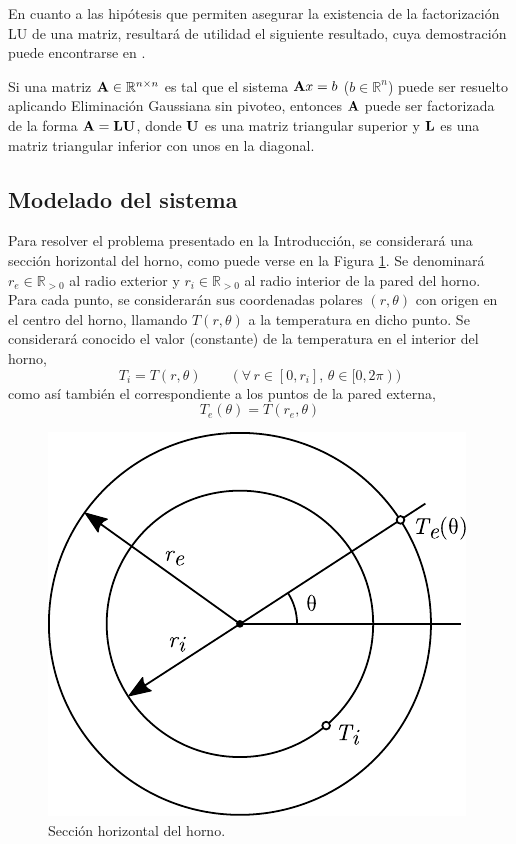             En cuanto a las hipótesis que permiten asegurar la existencia de la factorización LU de una matriz, resultará de utilidad el siguiente resultado, cuya demostración puede encontrarse en \cite[p.~403]{burden}.

            \begin{prop} \label{prop:EG sin pivoteo implica LU}
                Si una matriz $\mathbf{A} \in \mathbb{R}^{n \times n}$ es tal que el sistema $\mathbf{A}x=b$ ($b \in \mathbb{R}^{n}$) puede ser resuelto aplicando Eliminación Gaussiana sin pivoteo, entonces $\mathbf{A}$ puede ser factorizada de la forma $\mathbf{A}=\mathbf{L}\mathbf{U}$, donde $\mathbf{U}$ es una matriz triangular superior y $\mathbf{L}$ es una matriz triangular inferior con unos en la diagonal.
            \end{prop}

    \subsection{Modelado del sistema}

        Para resolver el problema presentado en la Introducción, se considerará una sección horizontal del horno, como puede verse en la Figura \ref{fig:seccion-horno}. Se denominará $r_e \in \mathbb{R}_{>0}$ al radio exterior y $r_i \in \mathbb{R}_{>0}$ al radio interior de la pared del horno. Para cada punto, se considerarán sus coordenadas polares $(r, \theta)$ con origen en el centro del horno, llamando $T(r, \theta)$ a la temperatura en dicho punto. Se considerará conocido el valor (constante) de la temperatura en el interior del horno, \[ T_i = T(r, \theta) \qquad (\forall \, r \in [0, r_i], \, \theta \in [0, 2 \pi)) \] como así también el correspondiente a los puntos de la pared externa, \[ T_e(\theta) = T(r_e, \theta) \]
        
        \begin{figure}[h]
          \centering

          \includegraphics{imagenes/seccion-horno.pdf}

          \caption{Sección horizontal del horno.}
          \label{fig:seccion-horno}
        \end{figure}

